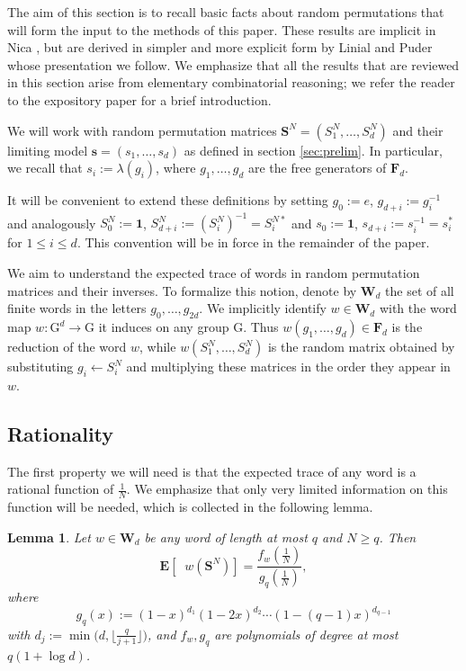 \documentclass[10pt,reqno]{amsart}
\newtheorem{lem}[thm]{Lemma}
\theoremstyle{definition}
\theoremstyle{remark}
\numberwithin{equation}{section}
\numberwithin{figure}{section}
\numberwithin{table}{section}
\newcommand{\ntrN}{\mathop{\mathrm{tr}_N}}
\newcommand{\id}{\mathbf{1}}
\begin{document}
The aim of this section is to recall basic facts about random permutations 
that will form the input to the methods of this paper. These results are 
implicit in Nica \cite{Nic94}, but are derived in simpler and more 
explicit form by Linial and Puder \cite{PL10} whose presentation we 
follow. We emphasize that all the results that are reviewed in this 
section arise from elementary combinatorial reasoning; we refer the reader 
to the expository paper \cite[\S 3]{Col22} for a brief introduction.

We will work with random permutation 
matrices $\boldsymbol{S}^N=(S_1^N,\ldots,S_d^N)$ and their limiting model 
$\boldsymbol{s}=(s_1,\ldots,s_d)$ as defined in section \ref{sec:prelim}.
In particular, we recall that $s_i:=\lambda(g_i)$, where
$g_1,\ldots,g_d$ are the free generators of $\mathbf{F}_d$.

It will be convenient to extend these definitions by setting $g_0:=e$, 
$g_{d+i}:=g_i^{-1}$ and analogously $S^N_0:=\id$, $S^N_{d+i}:=(S_i^N)^{-1} 
= S_i^{N*}$ and $s_0:=\id$, $s_{d+i}:=s_i^{-1}=s_i^*$ for $1\le i\le d$. 
This convention will be in force in the remainder of the paper.

We aim to understand the expected trace of words in random permutation 
matrices and their inverses. To formalize this notion, denote by 
$\mathbf{W}_d$ the set of all finite words in the letters 
$g_0,\ldots,g_{2d}$. We implicitly identify $w\in\mathbf{W}_d$ with 
the word map $w:\mathrm{G}^d\to\mathrm{G}$ it induces on any group 
$\mathrm{G}$. Thus $w(g_1,\ldots,g_d)\in\mathbf{F}_d$ is the reduction of 
the word $w$, while $w(S_1^N,\ldots,S_d^N)$ is the random matrix obtained 
by substituting $g_i\leftarrow S_i^N$ and multiplying these matrices in 
the order they appear in $w$.


\subsection{Rationality}

The first property we will need is that the expected trace of any word is 
a rational function of $\frac{1}{N}$. We emphasize that only very limited 
information on this function will be needed, which is collected in the 
following lemma.

\begin{lem}
\label{lem:wordrational}
Let $w\in\mathbf{W}_d$ be any word of length at most $q$ and $N\ge q$. 
Then 
$$
        \mathbf{E}[\ntrN w(\boldsymbol{S}^N)] =
	\frac{f_w(\tfrac{1}{N})}{g_q(\tfrac{1}{N})},
$$
where
$$
	g_q(x) :=
	(1-x)^{d_1}(1-2x)^{d_2}\cdots 
	(1-(q-1)x)^{d_{q-1}}
$$
with $d_j := \min\big(d,\lfloor \frac{q}{j+1}\rfloor\big)$, 
and $f_w,g_q$ are polynomials of degree at most $q(1+\log d)$.
\end{lem}
\end{document}
